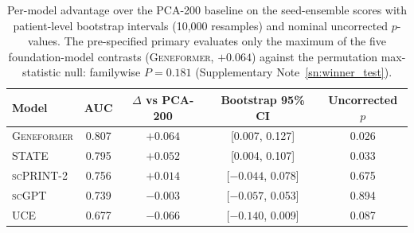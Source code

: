 \documentclass[11pt,a4paper]{article}
\newcommand{\model}[1]{\textsc{#1}}
\begin{document}
\begin{table}[t]
\centering
\caption{Per-model advantage over the PCA-200 baseline on the seed-ensemble
scores with patient-level bootstrap intervals (10{,}000 resamples) and
nominal uncorrected $p$-values. The pre-specified primary evaluates only the
maximum of the five foundation-model contrasts (\model{Geneformer},
$+0.064$) against the permutation max-statistic null: familywise
$P = 0.181$ (Supplementary Note~\ref{sn:winner_test}).}
\label{tab:winner_ensemble}
\small
\begin{tabular}{lcccc}
\toprule
\textbf{Model} & \textbf{AUC} & \textbf{$\Delta$ vs PCA-200} & \textbf{Bootstrap 95\% CI} & \textbf{Uncorrected $p$} \\
\midrule
\model{Geneformer} & 0.807 & $+0.064$ & [0.007, 0.127] & 0.026 \\
\model{STATE} & 0.795 & $+0.052$ & [0.004, 0.107] & 0.033 \\
\model{scPRINT-2} & 0.756 & $+0.014$ & [$-0.044$, 0.078] & 0.675 \\
\model{scGPT} & 0.739 & $-0.003$ & [$-0.057$, 0.053] & 0.894 \\
\model{UCE} & 0.677 & $-0.066$ & [$-0.140$, 0.009] & 0.087 \\
\bottomrule
\end{tabular}
\end{table}
\end{document}
